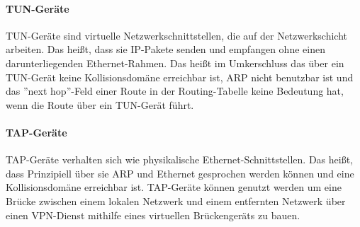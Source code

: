 \paragraph{TUN-Geräte}
TUN-Geräte sind virtuelle Netzwerkschnittstellen, die auf der Netzwerkschicht arbeiten.
Das heißt, dass sie IP-Pakete senden und empfangen ohne einen darunterliegenden Ethernet-Rahmen.
Das heißt im Umkerschluss das über ein TUN-Gerät keine Kollisionsdomäne erreichbar ist,
ARP nicht benutzbar ist und das ''next hop''-Feld einer Route in der Routing-Tabelle
keine Bedeutung hat, wenn die Route über ein TUN-Gerät führt.

\paragraph{TAP-Geräte}
TAP-Geräte verhalten sich wie physikalische Ethernet-Schnittstellen.
Das heißt, dass Prinzipiell über sie ARP und Ethernet gesprochen werden können
und eine Kollisionsdomäne erreichbar ist. TAP-Geräte können genutzt werden
um eine Brücke zwischen einem lokalen Netzwerk und einem entfernten
Netzwerk über einen \ac{VPN}-Dienst mithilfe eines virtuellen Brückengeräts
zu bauen.

